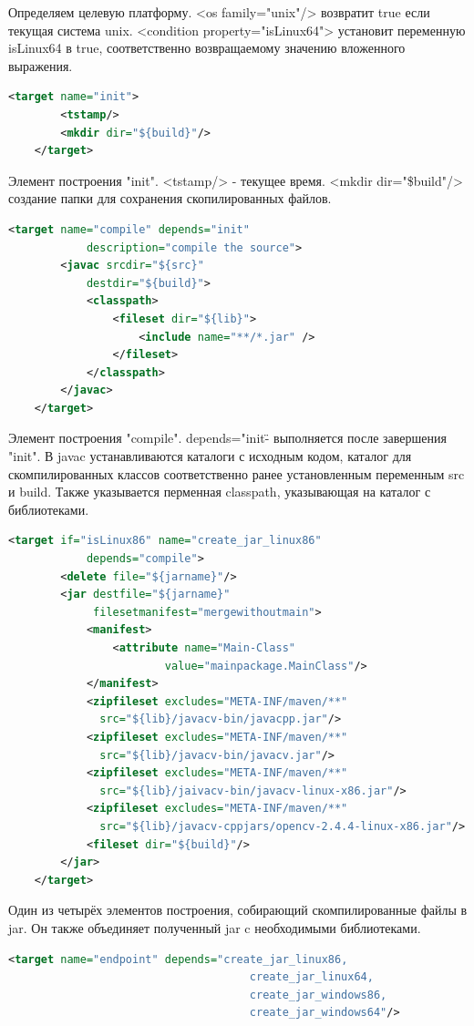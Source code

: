 \documentclass[12pt,a4paper]{extarticle} %
\begin{document}
    Определяем целевую платформу.  <os family="unix"/> возвратит true если текущая система unix.  <condition property="isLinux64"> установит переменную isLinux64 в true, соответственно возвращаемому значению вложенного выражения.
\begin{lstlisting}[language=xml]
    <target name="init">
        <tstamp/>
        <mkdir dir="${build}"/>        
    </target>
\end{lstlisting}

    Элемент построения "init". <tstamp/> - текущее время. <mkdir dir="\${build}"/> создание папки для сохранения скопилированных файлов.
\begin{lstlisting}[language=xml]
    <target name="compile" depends="init" 
            description="compile the source">
        <javac srcdir="${src}" 
            destdir="${build}">
            <classpath>
                <fileset dir="${lib}">
                    <include name="**/*.jar" />
                </fileset>
            </classpath>
        </javac>
    </target>
\end{lstlisting}

    Элемент построения "compile". depends="init\" - выполняется после завершения "init". В javac устанавливаются каталоги с исходным кодом, каталог для скомпилированных классов соответственно ранее установленным переменным src и build. Также указывается перменная classpath, указывающая на каталог с библиотеками.
\begin{lstlisting}[language=xml]
    <target if="isLinux86" name="create_jar_linux86" 
            depends="compile">
        <delete file="${jarname}"/>
        <jar destfile="${jarname}" 
             filesetmanifest="mergewithoutmain">
            <manifest>
                <attribute name="Main-Class" 
                        value="mainpackage.MainClass"/>
            </manifest>
            <zipfileset excludes="META-INF/maven/**" 
              src="${lib}/javacv-bin/javacpp.jar"/>
            <zipfileset excludes="META-INF/maven/**"
              src="${lib}/javacv-bin/javacv.jar"/>
            <zipfileset excludes="META-INF/maven/**" 
              src="${lib}/jaivacv-bin/javacv-linux-x86.jar"/>
            <zipfileset excludes="META-INF/maven/**" 
              src="${lib}/javacv-cppjars/opencv-2.4.4-linux-x86.jar"/>
            <fileset dir="${build}"/>
        </jar>
    </target>
\end{lstlisting}

    Один из четырёх элементов построения, собирающий скомпилированные файлы в jar. Он также объединяет полученный jar c необходимыми библиотеками.
\begin{lstlisting}[language=xml]
    <target name="endpoint" depends="create_jar_linux86,
                                     create_jar_linux64, 
                                     create_jar_windows86, 
                                     create_jar_windows64"/>
\end{lstlisting}
\end{document}
